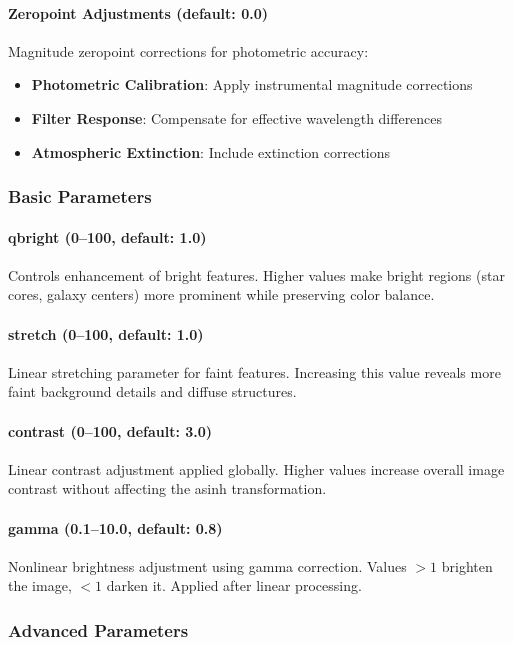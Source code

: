 \documentclass[11pt,a4paper]{article}
\begin{document}
\paragraph{Zeropoint Adjustments (default: 0.0)}
Magnitude zeropoint corrections for photometric accuracy:
\begin{itemize}[leftmargin=*]
\item \textbf{Photometric Calibration}: Apply instrumental magnitude
corrections
\item \textbf{Filter Response}: Compensate for effective wavelength
differences
\item \textbf{Atmospheric Extinction}: Include extinction corrections
\end{itemize}

\subsubsection{Basic Parameters}

\paragraph{qbright (0--100, default: 1.0)}
Controls enhancement of bright features. Higher values make bright regions
(star cores, galaxy centers) more prominent while preserving color balance.

\paragraph{stretch (0--100, default: 1.0)}
Linear stretching parameter for faint features. Increasing this value
reveals more faint background details and diffuse structures.

\paragraph{contrast (0--100, default: 3.0)}
Linear contrast adjustment applied globally. Higher values increase overall
image contrast without affecting the asinh transformation.

\paragraph{gamma (0.1--10.0, default: 0.8)}
Nonlinear brightness adjustment using gamma correction. Values $> 1$
brighten the image, $< 1$ darken it. Applied after linear processing.

\subsubsection{Advanced Parameters}
\end{document}
